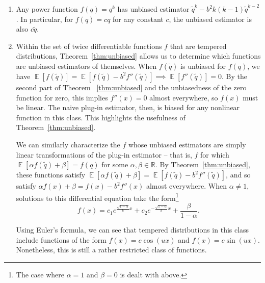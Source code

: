 \documentclass[11pt]{article}
\newcommand{\E}{\operatorname{\mathbb{E}}}
\newcommand{\R}{\mathbb{R}}
\begin{document}
\begin{example}
\label{ex:UnbiasedEstExamples_powerFunc}
\begin{enumerate}
    \item Any power function $f(q) = q^k$ has unbiased estimator $\tilde{q}^k - b^2 k(k-1) \tilde{q}^{k-2}$. In particular, for $f(q) = cq$ for any constant $c$, the unbiased estimator is also $c\tilde{q}$.
    \item Within the set of twice differentiable functions $f$ that are tempered distributions, Theorem~\ref{thm:unbiased} allows us to determine which functions are unbiased estimators of themselves. When $f(\tilde{q})$ is unbiased for $f(q)$, we have $\E[f(\tilde{q})] = \E[f(\tilde{q}) - b^2 f''(\tilde{q})] \implies \E[f''(\tilde{q})] = 0$. By the second part of Theorem ~\ref{thm:unbiased} and the unbiasedness of the zero function for zero, this implies $f''(x) = 0$ almost everywhere, so $f(x)$ must be linear. The naive plug-in estimator, then, is biased for any nonlinear function in this class. This highlights the usefulness of Theorem~\ref{thm:unbiased}. 

    We can similarly characterize the $f$ whose unbiased estimators are simply linear transformations of the plug-in estimator -- that is, $f$ for which $\E[\alpha f(\tilde{q}) + \beta] = f(q)$ for some $\alpha, \beta \in \R$. By Theorem~\ref{thm:unbiased}, these functions satisfy $\E[\alpha f(\tilde{q}) + \beta] = \E[f(\tilde{q}) - b^2 f''(\tilde{q})]$, and so satisfy $\alpha f(x) + \beta = f(x) - b^2 f''(x)$ almost everywhere. When $\alpha \neq 1$, solutions to this differential equation take the form\footnote{The case where $\alpha = 1$ and $\beta = 0$ is dealt with above.}
    $$f(x) = c_1 e^{\frac{\sqrt{1-\alpha}}{b} x}+c_2 e^{-\frac{\sqrt{1-\alpha }}{b}x} + \frac{\beta}{1-\alpha}.$$

    Using Euler's formula, we can see that tempered distributions in this class include functions of the form $f(x) = c \cos(u x)$ and $f(x) = c\sin(u x)$. Nonetheless, this is still a rather restricted class of functions.

\end{enumerate}
\end{example}
\end{document}
